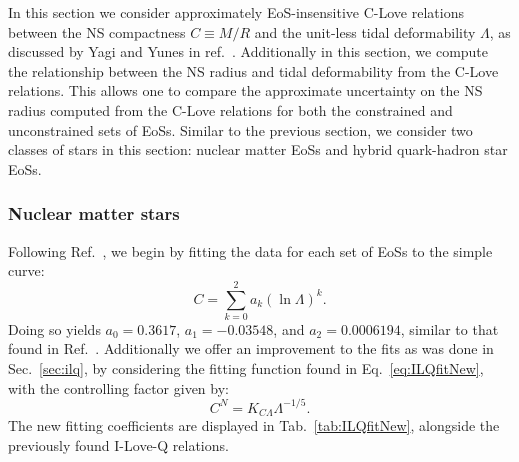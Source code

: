 \documentclass[prd,twocolumn,nofootinbib,superscriptaddress,amsmath,amssymb]{revtex4-1}
\begin{document}
In this section we consider approximately EoS-insensitive C-Love relations between the NS compactness $C \equiv M/R$ and the unit-less tidal deformability $\Lambda$, as discussed by Yagi and Yunes in ref.~\cite{Yagi:binLove}.
Additionally in this section, we compute the relationship between the NS radius and tidal deformability from the C-Love relations.
This allows one to compare the approximate uncertainty on the NS radius computed from the C-Love relations for both the constrained and unconstrained sets of EoSs. 
Similar to the previous section, we consider two classes of stars in this section: nuclear matter EoSs and hybrid quark-hadron star EoSs.

\subsubsection{Nuclear matter stars}
\label{sec:clove-nuc}

Following Ref.~\cite{Yagi:binLove}, we begin by fitting the data for each set of EoSs to the simple curve:
\begin{equation}
C = \sum^2_{k=0} a_k (\ln{\Lambda})^k.
\end{equation}
Doing so yields $a_0 = 0.3617$, $a_1 = -0.03548$, and $a_2 = 0.0006194$, similar to that found in Ref.~\cite{Yagi:binLove}.
Additionally we offer an improvement to the fits as was done in Sec.~\ref{sec:ilq}, by considering the fitting function found in Eq.~\ref{eq:ILQfitNew}, with the controlling factor given by:
\begin{equation}
C^N=K_{C\Lambda}\Lambda^{-1/5}.\label{eq:cloveFit}
\end{equation}
The new fitting coefficients are displayed in Tab.~\ref{tab:ILQfitNew}, alongside the previously found I-Love-Q relations.
\end{document}
